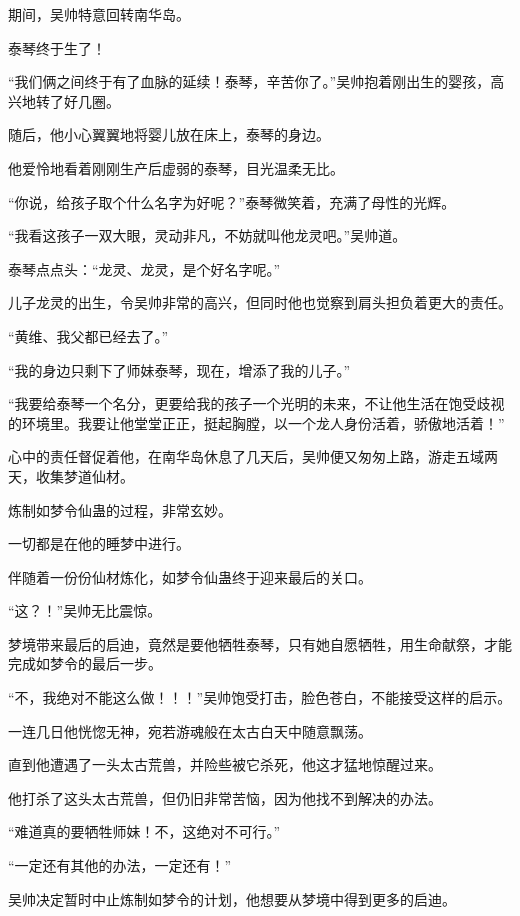 
\begin{this_body}

期间，吴帅特意回转南华岛。

泰琴终于生了！

“我们俩之间终于有了血脉的延续！泰琴，辛苦你了。”吴帅抱着刚出生的婴孩，高兴地转了好几圈。

随后，他小心翼翼地将婴儿放在床上，泰琴的身边。

他爱怜地看着刚刚生产后虚弱的泰琴，目光温柔无比。

“你说，给孩子取个什么名字为好呢？”泰琴微笑着，充满了母性的光辉。

“我看这孩子一双大眼，灵动非凡，不妨就叫他龙灵吧。”吴帅道。

泰琴点点头：“龙灵、龙灵，是个好名字呢。”

儿子龙灵的出生，令吴帅非常的高兴，但同时他也觉察到肩头担负着更大的责任。

“黄维、我父都已经去了。”

“我的身边只剩下了师妹泰琴，现在，增添了我的儿子。”

“我要给泰琴一个名分，更要给我的孩子一个光明的未来，不让他生活在饱受歧视的环境里。我要让他堂堂正正，挺起胸膛，以一个龙人身份活着，骄傲地活着！”

心中的责任督促着他，在南华岛休息了几天后，吴帅便又匆匆上路，游走五域两天，收集梦道仙材。

炼制如梦令仙蛊的过程，非常玄妙。

一切都是在他的睡梦中进行。

伴随着一份份仙材炼化，如梦令仙蛊终于迎来最后的关口。

“这？！”吴帅无比震惊。

梦境带来最后的启迪，竟然是要他牺牲泰琴，只有她自愿牺牲，用生命献祭，才能完成如梦令的最后一步。

“不，我绝对不能这么做！！！”吴帅饱受打击，脸色苍白，不能接受这样的启示。

一连几日他恍惚无神，宛若游魂般在太古白天中随意飘荡。

直到他遭遇了一头太古荒兽，并险些被它杀死，他这才猛地惊醒过来。

他打杀了这头太古荒兽，但仍旧非常苦恼，因为他找不到解决的办法。

“难道真的要牺牲师妹！不，这绝对不可行。”

“一定还有其他的办法，一定还有！”

吴帅决定暂时中止炼制如梦令的计划，他想要从梦境中得到更多的启迪。


\end{this_body}
